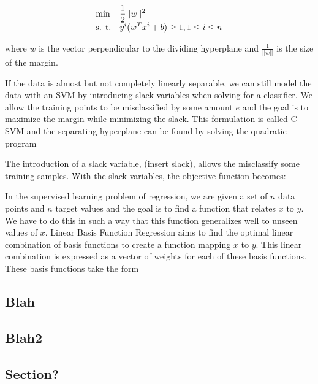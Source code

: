 \documentclass[a4paper,twoside]{article}
\begin{document}
\begin{equation}
\begin{array}{ll@{}ll}
\text{min}  & \displaystyle \frac{1}{2} ||w||^2 &\\
\text{s. t.}& \displaystyle y^i(w^T x^i + b) \geq 1 , 1 \leq i \leq n
\end{array}
\end{equation}

where $w$ is the vector perpendicular to the dividing hyperplane and $\frac{1}{||w||}$ is the size of the margin.

If the data is almost but not completely linearly separable, we can still model the data with an SVM by introducing slack variables when solving for a classifier. We allow the training points to be misclassified by some amount $e$ and the goal is to maximize the margin while minimizing the slack. This formulation is called C-SVM and the separating hyperplane can be found by solving the quadratic program 


 The introduction of a slack variable, (insert slack), allows the misclassify some training samples. With the slack variables, the objective function becomes:

In the supervised learning problem of regression, we are given a set of $n$ data points and $n$ target values and the goal is to find a function that relates $x$ to $y$. We have to do this in such a way that this function generalizes well to unseen values of $x$. Linear Basis Function Regression aims to find the optimal linear combination of basis functions to create a function mapping $x$ to $y$. This linear combination is expressed as a vector of weights for each of these basis functions. These basis functions take the form

\subsection{Blah}


\subsection{Blah2}


\subsection{Section?}
\end{document}
